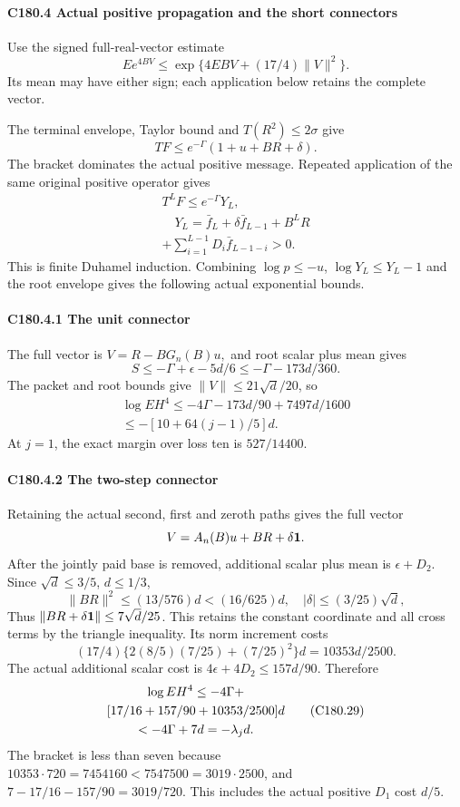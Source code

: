 \paragraph{C180.4 Actual positive propagation and the short connectors}

Use the signed full-real-vector estimate
\[
 Ee^{4BV}\le\exp\{4EBV+(17/4)\|V\|^2\}.             \tag{C180.26}
\]
Its mean may have either sign; each application below retains the complete vector.

The terminal envelope, Taylor bound and \(T(R^2)\le2\sigma\) give
\[
 T F\le e^{-\Gamma}(1+u+BR+\delta).
\]
The bracket dominates the actual positive message. Repeated application of the same original positive operator gives
\[
\begin{gathered}
T^LF\le e^{-\Gamma}Y_L,\\
\quad Y_L=\bar f_L+\delta \bar f_{L-1}+B^LR\\
+\sum_{i=1}^{L-1}D_i \bar f_{L-1-i}>0.
\end{gathered}\tag{C180.27}
\]
This is finite Duhamel induction. Combining \(\log p\le-u\), \(\log Y_L\le Y_L-1\) and the root envelope gives the following actual exponential bounds.

\paragraph{C180.4.1 The unit connector}

The full vector is \(V=R-BG_n(B)u,\allowbreak \) and root scalar plus mean gives
\[
 S\le-\Gamma+\epsilon-5d/6\le-\Gamma-173d/360.
\]
The packet and root bounds give \(\|V\|\le21\sqrt d/20\), so
\[
\begin{gathered}
\log EH^4\le-4\Gamma-173d/90+7497d/1600\\
\le-[10+64(j-1)/5]d.
\end{gathered}\tag{C180.28}
\]
At \(j=1\), the exact margin over loss ten is \(527/14400\).

\paragraph{C180.4.2 The two-step connector}

Retaining the actual second, first and zeroth paths gives the full vector
\[
 V=A_n(B)u+BR+\delta\mathbf1.
\]
After the jointly paid base is removed, additional scalar plus mean is \(\epsilon+D_2\). Since \(\sqrt d\le3/5\), \(d\le1/3\),
\[
 \|BR\|^2\le(13/576)d<(16/625)d,
 \quad |\delta|\le(3/25)\sqrt d,
\]
Thus \(\|BR+\delta\mathbf1\|\le7\sqrt d/25\). This retains the constant coordinate and all cross terms by the triangle inequality. Its norm increment costs
\[
 (17/4)\{2(8/5)(7/25)+(7/25)^2\}d=10353d/2500.
\]
The actual additional scalar cost is \(4\epsilon+4D_2\le157d/90\). Therefore
\[
\begin{gathered}
\log EH^4\le-4\Gamma+\\
\relax [17/16+157/90+10353/2500]d\\
<-4\Gamma+7d=-\lambda_jd.
\end{gathered}\tag{C180.29}
\]
The bracket is less than seven because \(10353\cdot720=7454160<7547500=3019\cdot2500\), and \(7-17/16-157/90=3019/720\). This includes the actual positive \(D_1\) cost \(d/5\).

